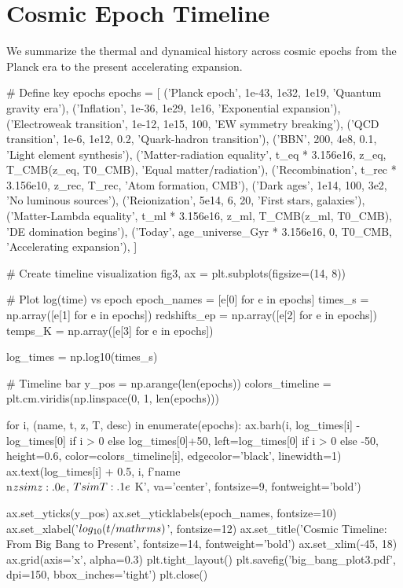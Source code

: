 \documentclass[a4paper, 11pt]{article}
\begin{document}
\section{Cosmic Epoch Timeline}

We summarize the thermal and dynamical history across cosmic epochs from the Planck era
to the present accelerating expansion.

\begin{pycode}
# Define key epochs
epochs = [
    ('Planck epoch', 1e-43, 1e32, 1e19, 'Quantum gravity era'),
    ('Inflation', 1e-36, 1e29, 1e16, 'Exponential expansion'),
    ('Electroweak transition', 1e-12, 1e15, 100, 'EW symmetry breaking'),
    ('QCD transition', 1e-6, 1e12, 0.2, 'Quark-hadron transition'),
    ('BBN', 200, 4e8, 0.1, 'Light element synthesis'),
    ('Matter-radiation equality', t_eq * 3.156e16, z_eq, T_CMB(z_eq, T0_CMB), 'Equal matter/radiation'),
    ('Recombination', t_rec * 3.156e10, z_rec, T_rec, 'Atom formation, CMB'),
    ('Dark ages', 1e14, 100, 3e2, 'No luminous sources'),
    ('Reionization', 5e14, 6, 20, 'First stars, galaxies'),
    ('Matter-Lambda equality', t_ml * 3.156e16, z_ml, T_CMB(z_ml, T0_CMB), 'DE domination begins'),
    ('Today', age_universe_Gyr * 3.156e16, 0, T0_CMB, 'Accelerating expansion'),
]

# Create timeline visualization
fig3, ax = plt.subplots(figsize=(14, 8))

# Plot log(time) vs epoch
epoch_names = [e[0] for e in epochs]
times_s = np.array([e[1] for e in epochs])
redshifts_ep = np.array([e[2] for e in epochs])
temps_K = np.array([e[3] for e in epochs])

log_times = np.log10(times_s)

# Timeline bar
y_pos = np.arange(len(epochs))
colors_timeline = plt.cm.viridis(np.linspace(0, 1, len(epochs)))

for i, (name, t, z, T, desc) in enumerate(epochs):
    ax.barh(i, log_times[i] - log_times[0] if i > 0 else log_times[0]+50,
            left=log_times[0] if i > 0 else -50,
            height=0.6, color=colors_timeline[i], edgecolor='black', linewidth=1)
    ax.text(log_times[i] + 0.5, i, f'{name}\\n$z \\sim {z:.0e}$, $T \\sim {T:.1e}$ K',
            va='center', fontsize=9, fontweight='bold')

ax.set_yticks(y_pos)
ax.set_yticklabels(epoch_names, fontsize=10)
ax.set_xlabel('$\\log_{10}(t / \\mathrm{s})$', fontsize=12)
ax.set_title('Cosmic Timeline: From Big Bang to Present', fontsize=14, fontweight='bold')
ax.set_xlim(-45, 18)
ax.grid(axis='x', alpha=0.3)
plt.tight_layout()
plt.savefig('big_bang_plot3.pdf', dpi=150, bbox_inches='tight')
plt.close()

\end{pycode}
\end{document}
